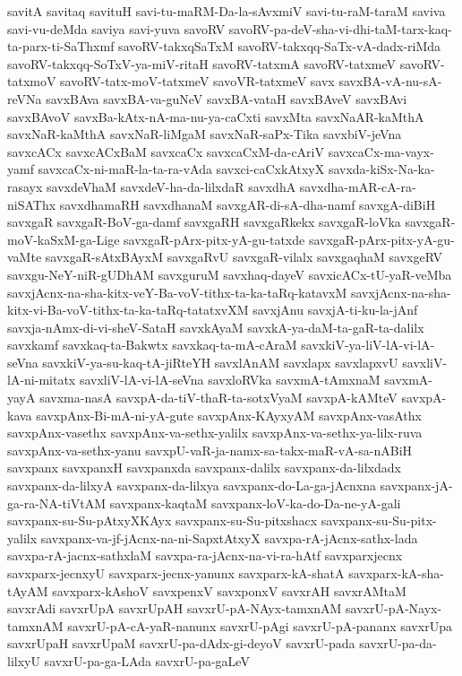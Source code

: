 {savitA
savitaq
savituH
savi-tu-maRM-Da-la-sAvxmiV
savi-tu-raM-taraM
saviva
savi-vu-deMda
saviya
savi-yuva
savoRV
savoRV-pa-deV-sha-vi-dhi-taM-tarx-kaq-ta-parx-ti-SaThxmf
savoRV-takxqSaTxM
savoRV-takxqq-SaTx-vA-dadx-riMda
savoRV-takxqq-SoTxV-ya-miV-ritaH
savoRV-tatxmA
savoRV-tatxmeV
savoRV-tatxmoV
savoRV-tatx-moV-tatxmeV
savoVR-tatxmeV
savx
savxBA-vA-nu-sA-reVNa
savxBAva
savxBA-va-guNeV
savxBA-vataH
savxBAveV
savxBAvi
savxBAvoV
savxBa-kAtx-nA-ma-nu-ya-caCxti
savxMta
savxNaAR-kaMthA
savxNaR-kaMthA
savxNaR-liMgaM
savxNaR-saPx-Tika
savxbiV-jeVna
savxcACx
savxcACxBaM
savxcaCx
savxcaCxM-da-cAriV
savxcaCx-ma-vayx-yamf
savxcaCx-ni-maR-la-ta-ra-vAda
savxci-caCxkAtxyX
savxda-kiSx-Na-ka-rasayx
savxdeVhaM
savxdeV-ha-da-lilxdaR
savxdhA
savxdha-mAR-cA-ra-niSAThx
savxdhamaRH
savxdhanaM
savxgAR-di-sA-dha-namf
savxgA-diBiH
savxgaR
savxgaR-BoV-ga-damf
savxgaRH
savxgaRkekx
savxgaR-loVka
savxgaR-moV-kaSxM-ga-Lige
savxgaR-pArx-pitx-yA-gu-tatxde
savxgaR-pArx-pitx-yA-gu-vaMte
savxgaR-sAtxBAyxM
savxgaRvU
savxgaR-vilalx
savxgaqhaM
savxgeRV
savxgu-NeY-niR-gUDhAM
savxguruM
savxhaq-dayeV
savxicACx-tU-yaR-veMba
savxjAcnx-na-sha-kitx-veY-Ba-voV-tithx-ta-ka-taRq-katavxM
savxjAcnx-na-sha-kitx-vi-Ba-voV-tithx-ta-ka-taRq-tatatxvXM
savxjAnu
savxjA-ti-ku-la-jAnf
savxja-nAmx-di-vi-sheV-SataH
savxkAyaM
savxkA-ya-daM-ta-gaR-ta-dalilx
savxkamf
savxkaq-ta-Bakwtx
savxkaq-ta-mA-cAraM
savxkiV-ya-liV-lA-vi-lA-seVna
savxkiV-ya-su-kaq-tA-jiRteYH
savxlAnAM
savxlapx
savxlapxvU
savxliV-lA-ni-mitatx
savxliV-lA-vi-lA-seVna
savxloRVka
savxmA-tAmxnaM
savxmA-yayA
savxma-nasA
savxpA-da-tiV-thaR-ta-sotxVyaM
savxpA-kAMteV
savxpA-kava
savxpAnx-Bi-mA-ni-yA-gute
savxpAnx-KAyxyAM
savxpAnx-vasAthx
savxpAnx-vasethx
savxpAnx-va-sethx-yalilx
savxpAnx-va-sethx-ya-lilx-ruva
savxpAnx-va-sethx-yanu
savxpU-vaR-ja-namx-sa-takx-maR-vA-sa-nABiH
savxpanx
savxpanxH
savxpanxda
savxpanx-dalilx
savxpanx-da-lilxdadx
savxpanx-da-lilxyA
savxpanx-da-lilxya
savxpanx-do-La-ga-jAcnxna
savxpanx-jA-ga-ra-NA-tiVtAM
savxpanx-kaqtaM
savxpanx-loV-ka-do-Da-ne-yA-gali
savxpanx-su-Su-pAtxyXKAyx
savxpanx-su-Su-pitxshacx
savxpanx-su-Su-pitx-yalilx
savxpanx-va-jf-jAcnx-na-ni-SapxtAtxyX
savxpa-rA-jAcnx-sathx-lada
savxpa-rA-jacnx-sathxlaM
savxpa-ra-jAcnx-na-vi-ra-hAtf
savxparxjecnx
savxparx-jecnxyU
savxparx-jecnx-yanunx
savxparx-kA-shatA
savxparx-kA-sha-tAyAM
savxparx-kAshoV
savxpenxV
savxponxV
savxrAH
savxrAMtaM
savxrAdi
savxrUpA
savxrUpAH
savxrU-pA-NAyx-tamxnAM
savxrU-pA-Nayx-tamxnAM
savxrU-pA-cA-yaR-nanunx
savxrU-pAgi
savxrU-pA-pananx
savxrUpa
savxrUpaH
savxrUpaM
savxrU-pa-dAdx-gi-deyoV
savxrU-pada
savxrU-pa-da-lilxyU
savxrU-pa-ga-LAda
savxrU-pa-gaLeV
}
